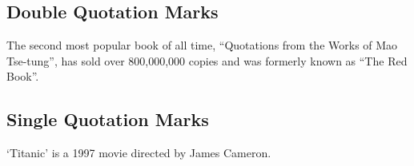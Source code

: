 \documentclass{article}
\begin{document}
\subsection*{Double Quotation Marks}
The second most popular book of all time, ``Quotations from the Works of Mao Tse-tung'', has sold over 800,000,000 copies and was formerly known as ``The Red Book''.

\subsection*{Single Quotation Marks}
`Titanic' is a 1997 movie directed by James Cameron.
\end{document}
